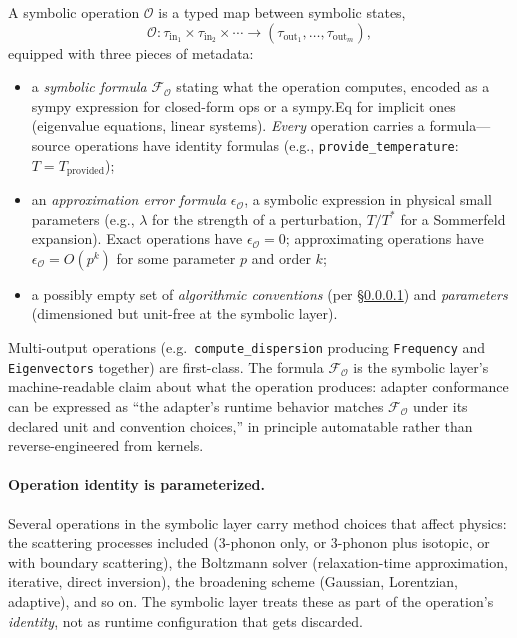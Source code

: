 \documentclass[11pt,a4paper]{article}
\begin{document}
A symbolic operation $\mathcal{O}$ is a typed map between symbolic states,
\begin{equation}
  \mathcal{O} : \tau_{\text{in}_1} \times \tau_{\text{in}_2} \times \cdots \to (\tau_{\text{out}_1}, \ldots, \tau_{\text{out}_m}),
\end{equation}
equipped with three pieces of metadata:
\begin{itemize}[leftmargin=2em]
  \item a \emph{symbolic formula} $\mathcal{F}_\mathcal{O}$ stating what the operation
        computes, encoded as a sympy expression for closed-form ops or a sympy.Eq for
        implicit ones (eigenvalue equations, linear systems). \emph{Every} operation
        carries a formula---source operations have identity formulas (e.g.,
        \texttt{provide\_temperature}: $T = T_{\text{provided}}$);
  \item an \emph{approximation error formula} $\epsilon_{\mathcal{O}}$, a symbolic
        expression in physical small parameters (e.g., $\lambda$ for the strength of a
        perturbation, $T/T^*$ for a Sommerfeld expansion). Exact operations have
        $\epsilon_{\mathcal{O}} = 0$; approximating operations have
        $\epsilon_{\mathcal{O}} = O(p^k)$ for some parameter $p$ and order $k$;
  \item a possibly empty set of \emph{algorithmic conventions} (per
        \S\ref{ssec:parameterized-operation-identity}) and \emph{parameters}
        (dimensioned but unit-free at the symbolic layer).
\end{itemize}
Multi-output operations (e.g.\ \texttt{compute\_dispersion} producing
\texttt{Frequency} and \texttt{Eigenvectors} together) are first-class. The formula
$\mathcal{F}_\mathcal{O}$ is the symbolic layer's machine-readable claim about what the
operation produces: adapter conformance can be expressed as ``the adapter's runtime
behavior matches $\mathcal{F}_\mathcal{O}$ under its declared unit and convention
choices,'' in principle automatable rather than reverse-engineered from kernels.


\paragraph{Operation identity is parameterized.}\label{ssec:parameterized-operation-identity}

Several operations in the symbolic layer carry method choices that affect physics: the scattering
processes included (3-phonon only, or 3-phonon plus isotopic, or with boundary scattering), the
Boltzmann solver (relaxation-time approximation, iterative, direct inversion), the broadening
scheme (Gaussian, Lorentzian, adaptive), and so on. The symbolic layer treats these as part of the
operation's \emph{identity}, not as runtime configuration that gets discarded.
\end{document}
